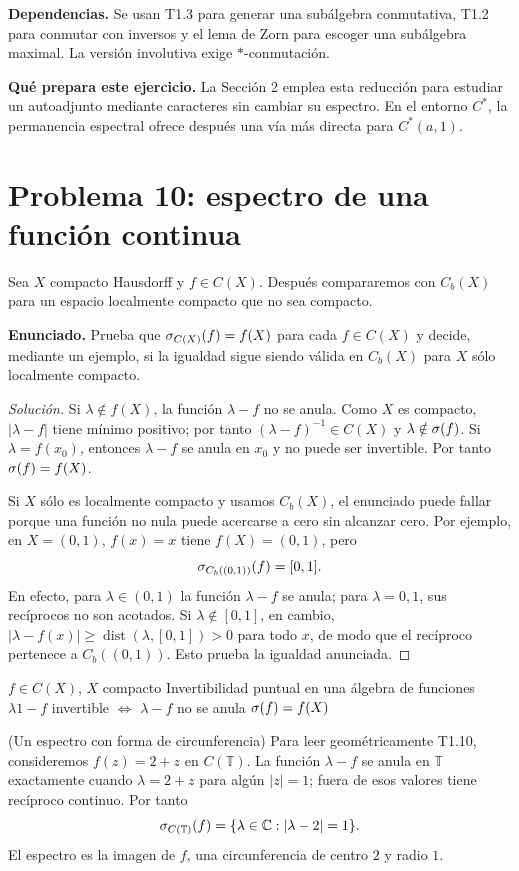 \noindent\textbf{Dependencias.} Se usan T1.3 para generar una subálgebra conmutativa, T1.2 para conmutar con inversos y el lema de Zorn para escoger una subálgebra maximal. La versión involutiva exige $*$-conmutación.

\noindent\textbf{Qué prepara este ejercicio.} La Sección 2 emplea esta reducción para estudiar un autoadjunto mediante caracteres sin cambiar su espectro. En el entorno $C^*$, la permanencia espectral ofrece después una vía más directa para $C^*(a,1)$.

\pagebreak
\section{Problema 10: espectro de una función continua}

Sea $X$ compacto Hausdorff y $f\in C(X)$. Después compararemos con $C_b(X)$ para un espacio
localmente compacto que no sea compacto.

\noindent\textbf{Enunciado.} Prueba que $\sigma_{C(X)}(f)=f(X)$ para cada $f\in C(X)$ y decide, mediante un ejemplo, si la igualdad sigue siendo válida en $C_b(X)$ para $X$ sólo localmente compacto.

\begin{proof}[Solución]
Si $\lambda\notin f(X)$, la función $\lambda-f$ no se anula. Como $X$ es compacto,
$|\lambda-f|$ tiene mínimo positivo; por tanto
$(\lambda-f)^{-1}\in C(X)$ y $\lambda\notin\sigma(f)$. Si $\lambda=f(x_0)$, entonces
$\lambda-f$ se anula en $x_0$ y no puede ser invertible. Por tanto $\sigma(f)=f(X)$.

Si $X$ sólo es localmente compacto y usamos $C_b(X)$, el enunciado puede fallar porque una función
no nula puede acercarse a cero sin alcanzar cero. Por ejemplo, en $X=(0,1)$, $f(x)=x$ tiene
$f(X)=(0,1)$, pero
\[
 \sigma_{C_b((0,1))}(f)=[0,1].
\]
En efecto, para $\lambda\in(0,1)$ la función $\lambda-f$ se anula; para $\lambda=0,1$,
sus recíprocos no son acotados. Si $\lambda\notin[0,1]$, en cambio,
$|\lambda-f(x)|\ge\operatorname{dist}(\lambda,[0,1])>0$ para todo $x$, de modo que el
recíproco pertenece a $C_b((0,1))$. Esto prueba la igualdad anunciada.
\end{proof}

\proofdiagram
{$f\in C(X)$, $X$ compacto}
{Invertibilidad puntual en una álgebra de funciones}
{$\lambda1-f$ invertible $\Longleftrightarrow$ $\lambda-f$ no se anula}
{$\sigma(f)=f(X)$}

\begin{cthejemplo}{(Un espectro con forma de circunferencia)}
Para leer geométricamente T1.10, consideremos $f(z)=2+z$ en $C(\mathbb T)$.
La función $\lambda-f$ se anula en $\mathbb T$ exactamente cuando
$\lambda=2+z$ para algún $|z|=1$; fuera de esos valores tiene recíproco continuo.
Por tanto
\[
 \sigma_{C(\mathbb T)}(f)=\{\lambda\in\mathbb C:|\lambda-2|=1\}.
\]
El espectro es la imagen de $f$, una circunferencia de centro $2$ y radio $1$.
\end{cthejemplo}

